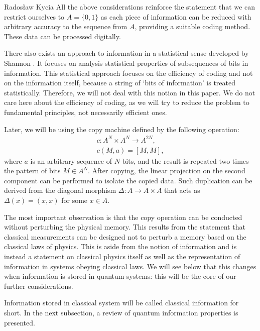 \begin{artengenv}{Radosław Kycia}
All the above considerations reinforce the statement that we can restrict ourselves to  $A=\{0,1\}$ as each piece of information can be reduced with arbitrary accuracy to the sequence from $A$, providing a suitable coding method. These data can be processed digitally.

There also exists an approach to information in a statistical sense developed by Shannon \parencite{RezaInformation}. It focuses on analysis statistical properties of subsequences of bits in information. This statistical approach focuses on the efficiency of coding and not on the information itself, because a string of `bits of information' is treated statistically. Therefore, we will not deal with this notion in this paper. We do not care here about the efficiency of coding, as we will try to reduce the problem to fundamental principles, not necessarily efficient ones.


Later, we will be using the copy machine defined by the following operation:
\begin{equation}
\begin{array}{c}
 c: A^N \times A^N \rightarrow A^{2N}, \\
 c(M,a)= [M,M],
\end{array}
\end{equation}
where $a$ is an arbitrary sequence of $N$ bits, and the result is repeated two times the pattern of bits $M \in A^N$. After copying, the linear projection on the second component can be performed to isolate the copied data. Such duplication can be derived from the diagonal morphism  \parencite[see][]{RosettaStone_Baez} $\Delta :A \rightarrow A \times A$ that acts as $\Delta (x) = (x,x)$ for some $x \in A$.

The most important observation is that the copy operation can be conducted without perturbing the physical memory. This results from the statement that classical measurements can be designed not to perturb a memory based on the classical laws of physics. This is aside from the notion of information and is instead a statement on classical physics itself as well as the representation of information in systems obeying classical laws. We will see below that this changes when information is stored in quantum systems: this will be the core of our further considerations.


Information stored in classical system will be called classical information for short. In the next subsection, a review of quantum information properties is presented.


\end{artengenv}
